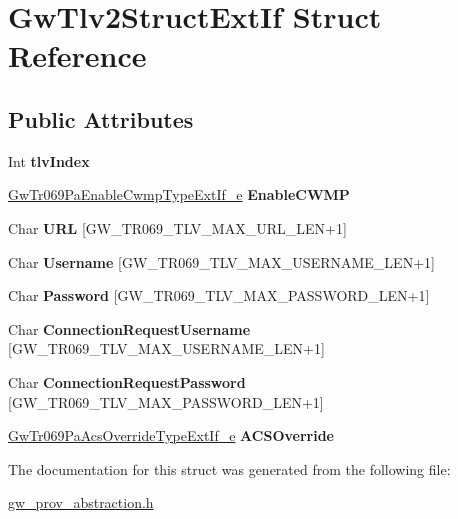 \hypertarget{structGwTlv2StructExtIf}{
\section{GwTlv2StructExtIf Struct Reference}
\label{structGwTlv2StructExtIf}
}
\subsection*{Public Attributes}
\begin{DoxyCompactItemize}
\item 
\hypertarget{structGwTlv2StructExtIf_aed352a211e088a9f47c743a4a5f1332d}{
Int {\bfseries tlvIndex}}
\label{structGwTlv2StructExtIf_aed352a211e088a9f47c743a4a5f1332d}

\item 
\hypertarget{structGwTlv2StructExtIf_aa1768df87690148a78b7cee0b6876524}{
\hyperlink{gw__prov__abstraction_8h_ab310de533f78bdeafa9e5c310f769de8}{GwTr069PaEnableCwmpTypeExtIf\_\-e} {\bfseries EnableCWMP}}
\label{structGwTlv2StructExtIf_aa1768df87690148a78b7cee0b6876524}

\item 
\hypertarget{structGwTlv2StructExtIf_a4ca89c0a1fd46fe0035d7b3336f5317b}{
Char {\bfseries URL} \mbox{[}GW\_\-TR069\_\-TLV\_\-MAX\_\-URL\_\-LEN+1\mbox{]}}
\label{structGwTlv2StructExtIf_a4ca89c0a1fd46fe0035d7b3336f5317b}

\item 
\hypertarget{structGwTlv2StructExtIf_a2ce29129a57414f09051230ffb7e06ce}{
Char {\bfseries Username} \mbox{[}GW\_\-TR069\_\-TLV\_\-MAX\_\-USERNAME\_\-LEN+1\mbox{]}}
\label{structGwTlv2StructExtIf_a2ce29129a57414f09051230ffb7e06ce}

\item 
\hypertarget{structGwTlv2StructExtIf_a070dac323d8f9d7d5e884c26d6e60ced}{
Char {\bfseries Password} \mbox{[}GW\_\-TR069\_\-TLV\_\-MAX\_\-PASSWORD\_\-LEN+1\mbox{]}}
\label{structGwTlv2StructExtIf_a070dac323d8f9d7d5e884c26d6e60ced}

\item 
\hypertarget{structGwTlv2StructExtIf_aef802c050b5ff8a5e1082169fbd701b1}{
Char {\bfseries ConnectionRequestUsername} \mbox{[}GW\_\-TR069\_\-TLV\_\-MAX\_\-USERNAME\_\-LEN+1\mbox{]}}
\label{structGwTlv2StructExtIf_aef802c050b5ff8a5e1082169fbd701b1}

\item 
\hypertarget{structGwTlv2StructExtIf_af455390e3c688de3d01b29be1607cc86}{
Char {\bfseries ConnectionRequestPassword} \mbox{[}GW\_\-TR069\_\-TLV\_\-MAX\_\-PASSWORD\_\-LEN+1\mbox{]}}
\label{structGwTlv2StructExtIf_af455390e3c688de3d01b29be1607cc86}

\item 
\hypertarget{structGwTlv2StructExtIf_a39af839c2785ed86063189e7abbe5d7e}{
\hyperlink{gw__prov__abstraction_8h_ade296172d2805a9c076fec2dfe3b0081}{GwTr069PaAcsOverrideTypeExtIf\_\-e} {\bfseries ACSOverride}}
\label{structGwTlv2StructExtIf_a39af839c2785ed86063189e7abbe5d7e}

\end{DoxyCompactItemize}


The documentation for this struct was generated from the following file:\begin{DoxyCompactItemize}
\item 
\hyperlink{gw__prov__abstraction_8h}{gw\_\-prov\_\-abstraction.h}\end{DoxyCompactItemize}
